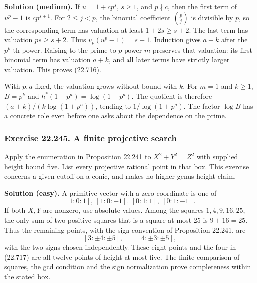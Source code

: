 \documentclass[
  11pt,
  a4paper,
]{article}
\begin{document}
\textbf{Solution (medium).} If \(u=1+c p^s\), \(s\ge1\), and
\(p\nmid c\), then the first term of \(u^p-1\) is \(c p^{s+1}\). For
\(2\le j<p\), the binomial coefficient \(\binom pj\) is divisible by
\(p\), so the corresponding term has valuation at least \(1+2s\ge s+2\).
The last term has valuation \(ps\ge s+2\). Thus \(v_p(u^p-1)=s+1\).
Induction gives \(a+k\) after the \(p^k\)-th power. Raising to the
prime-to-\(p\) power \(m\) preserves that valuation: its first binomial
term has valuation \(a+k\), and all later terms have strictly larger
valuation. This proves (22.716).

With \(p,a\) fixed, the valuation grows without bound with \(k\). For
\(m=1\) and \(k\ge1\), \(B=p^k\) and \(h^*(1+p^a)=\log(1+p^a)\). The
quotient is therefore \((a+k)/(k\log(1+p^a))\), tending to
\(1/\log(1+p^a)\). The factor \(\log B\) has a concrete role even before
one asks about the dependence on the prime.

\subsubsection{Exercise 22.245. A finite projective
search}\label{exercise-22.245.-a-finite-projective-search}

Apply the enumeration in Proposition 22.241 to \(X^2+Y^2=Z^2\) with
supplied height bound five. List every projective rational point in that
box. This exercise concerns a given cutoff on a conic, and makes no
higher-genus height claim.

\textbf{Solution (easy).} A primitive vector with a zero coordinate is
one of \[
 [1:0:1],\ [1:0:-1],\ [0:1:1],\ [0:1:-1].
 \tag{22.717}
\] If both \(X,Y\) are nonzero, use absolute values. Among the squares
\(1,4,9,16,25\), the only sum of two positive squares that is a square
at most 25 is \(9+16=25\). Thus the remaining points, with the sign
convention of Proposition 22.241, are \[
 [3:\pm4:\pm5],\qquad [4:\pm3:\pm5],
 \tag{22.718}
\] with the two signs chosen independently. These eight points and the
four in (22.717) are all twelve points of height at most five. The
finite comparison of squares, the gcd condition and the sign
normalization prove completeness within the stated box.
\end{document}
